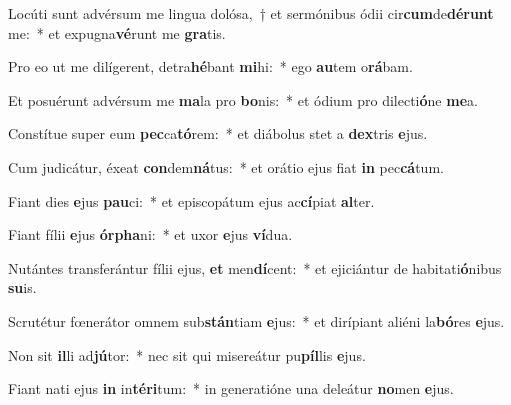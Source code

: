 \item Locúti sunt advérsum me lingua dolósa,~† et sermónibus ódii cir\textbf{cum}de\textbf{dé}\textbf{runt} me:~* et expugna\textbf{vé}runt me \textbf{gra}tis.
\item Pro eo ut me dilígerent, detra\textbf{hé}bant \textbf{mi}hi:~* ego \textbf{au}tem o\textbf{rá}bam.
\item Et posuérunt advérsum me \textbf{ma}la pro \textbf{bo}nis:~* et ódium pro dilecti\textbf{ó}ne \textbf{me}a.
\item Constítue super eum \textbf{pec}ca\textbf{tó}rem:~* et diábolus stet a \textbf{dex}tris \textbf{e}jus.
\item Cum judicátur, éxeat \textbf{con}dem\textbf{ná}tus:~* et orátio ejus fiat \textbf{in} pec\textbf{cá}tum.
\item Fiant dies \textbf{e}jus \textbf{pau}ci:~* et episcopátum ejus ac\textbf{cí}piat \textbf{al}ter.
\item Fiant fílii \textbf{e}jus \textbf{ór}\textbf{pha}ni:~* et uxor \textbf{e}jus \textbf{ví}dua.
\item Nutántes transferántur fílii ejus, \textbf{et} men\textbf{dí}cent:~* et ejiciántur de habitati\textbf{ó}nibus \textbf{su}is.
\item Scrutétur fœnerátor omnem sub\textbf{stán}tiam \textbf{e}jus:~* et dirípiant aliéni la\textbf{bó}res \textbf{e}jus.
\item Non sit \textbf{il}li ad\textbf{jú}tor:~* nec sit qui misereátur pu\textbf{píl}lis \textbf{e}jus.
\item Fiant nati ejus \textbf{in} in\textbf{tér}\textbf{i}tum:~* in generatióne una deleátur \textbf{no}men \textbf{e}jus.
